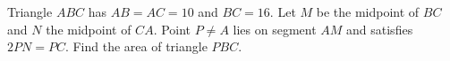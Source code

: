 Triangle $ABC$ has $AB=AC=10$ and $BC=16$. Let $M$ be the midpoint of $BC$ and $N$ the midpoint of $CA$. Point $P\ne A$ lies on segment $AM$ and satisfies $2PN=PC$. Find the area of triangle $PBC$.
